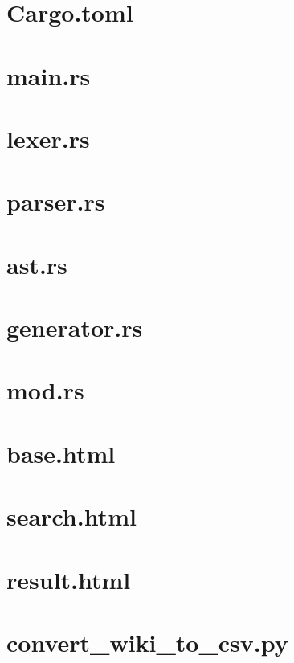 \section{Cargo.toml}

\section{main.rs}

\section{lexer.rs}

\section{parser.rs}

\section{ast.rs}

\section{generator.rs}

\section{mod.rs}

\section{base.html}

\section{search.html}

\section{result.html}

\section{convert\_wiki\_to\_csv.py}


